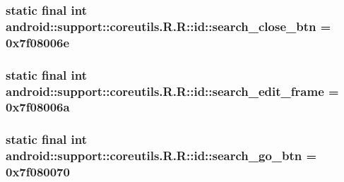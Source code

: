 \hypertarget{classandroid_1_1support_1_1coreutils_1_1_r_1_1id_9640e122123c2211c290ad6037f6d7fc}{
\subsubsection[{search\_\-close\_\-btn}]{\setlength{\rightskip}{0pt plus 5cm}static final int android::support::coreutils.R.R::id::search\_\-close\_\-btn = 0x7f08006e}}
\label{classandroid_1_1support_1_1coreutils_1_1_r_1_1id_9640e122123c2211c290ad6037f6d7fc}


\hypertarget{classandroid_1_1support_1_1coreutils_1_1_r_1_1id_62975de1596d63bed6533cab80443e68}{
\subsubsection[{search\_\-edit\_\-frame}]{\setlength{\rightskip}{0pt plus 5cm}static final int android::support::coreutils.R.R::id::search\_\-edit\_\-frame = 0x7f08006a}}
\label{classandroid_1_1support_1_1coreutils_1_1_r_1_1id_62975de1596d63bed6533cab80443e68}


\hypertarget{classandroid_1_1support_1_1coreutils_1_1_r_1_1id_52af1ec8cb4b0d82d4c1e9990edef0fe}{
\subsubsection[{search\_\-go\_\-btn}]{\setlength{\rightskip}{0pt plus 5cm}static final int android::support::coreutils.R.R::id::search\_\-go\_\-btn = 0x7f080070}}
\label{classandroid_1_1support_1_1coreutils_1_1_r_1_1id_52af1ec8cb4b0d82d4c1e9990edef0fe}


